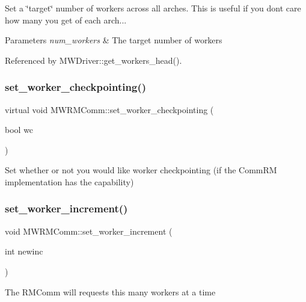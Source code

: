 Set a \char`\"{}target\char`\"{} number of workers across all arches. This is useful if you don\textquotesingle{}t care how many you get of each arch... 
\begin{DoxyParams}{Parameters}
{\em num\+\_\+workers} & The target number of workers \\
\hline
\end{DoxyParams}


Referenced by M\+W\+Driver\+::get\+\_\+workers\+\_\+head().

\mbox{\label{classMWRMComm_abff2205c7cd05ba73701b5e813873e46}} 
\subsubsection{\texorpdfstring{set\+\_\+worker\+\_\+checkpointing()}{set\_worker\_checkpointing()}}
{\footnotesize\ttfamily virtual void M\+W\+R\+M\+Comm\+::set\+\_\+worker\+\_\+checkpointing (\begin{DoxyParamCaption}\item[{bool}]{wc }\end{DoxyParamCaption})\hspace{0.3cm}{\ttfamily [virtual]}}

Set whether or not you would like worker checkpointing (if the Comm\+RM implementation has the capability) \mbox{\label{classMWRMComm_adcb46dfbabd51a0690d70e39a0396659}} 
\subsubsection{\texorpdfstring{set\+\_\+worker\+\_\+increment()}{set\_worker\_increment()}}
{\footnotesize\ttfamily void M\+W\+R\+M\+Comm\+::set\+\_\+worker\+\_\+increment (\begin{DoxyParamCaption}\item[{int}]{newinc }\end{DoxyParamCaption})}

The R\+M\+Comm will requests this many workers at a time \mbox{\label{classMWRMComm_a6c500b03f49fbab5a879dfec1f8c492e}} 
